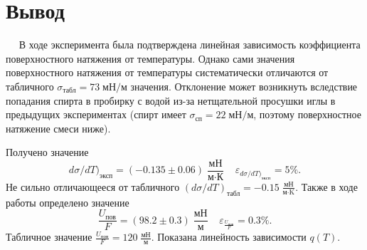 \documentclass[12pt,a4paper]{article}
\begin{document}
	\section*{Вывод}
	
		$\quad$ В ходе эксперимента была подтверждена линейная зависимость коэффициента поверхностного натяжения от температуры. Однако сами значения поверхностного натяжения от температуры систематически отличаются от табличного 
		$\sigma_{\text{табл}} = 73 \; \text{мН}/\text{м}$
		значения. Отклонение может возникнуть вследствие попадания спирта в пробирку с водой из-за нетщательной просушки иглы в предыдущих экспериментах (спирт имеет $\sigma_{\text{сп}} = 22 \; \text{мН}/\text{м}$, поэтому поверхностное натяжение смеси ниже).
		
		
		Получено значение 
		$$d\sigma/dT)_{\text{эксп}} = (-0.135 \pm 0.06) \; \frac{\text{мН}}{\text{м}\cdot\text{К}} \;\;\;\; \varepsilon_{d\sigma/dT)_{\text{эксп}}}=5\%.$$
		Не сильно отличающееся от табличного
		$(d\sigma/dT)_{\text{табл}} = - 0.15 \; \frac{\text{мН}}{\text{м} \cdot \text{K}}.$
		Также в ходе работы определено значение
		$$\frac{U_{\text{пов}}}{F} = (98.2 \pm 0.3) \; \frac{\text{мН}}{\text{м}}  \;\;\;\; \varepsilon_{\frac{U_{\text{пов}}}{F}}=0.3\%.$$
		Табличное значение $\frac{U_{\text{пов}}}{F} = 120 \; \frac{\text{мН}}{\text{м}}.$
		Показана линейность зависимости $q(T).$
		
\end{document}
